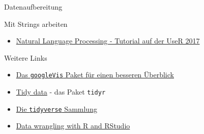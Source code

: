 \documentclass[ignorenonframetext,]{beamer}
\providecommand{\tightlist}{%
\setlength{\itemsep}{0pt}\setlength{\parskip}{0pt}}
\begin{document}
\begin{frame}[fragile]{Datenaufbereitung}
\begin{block}{Mit Strings arbeiten}
\begin{itemize}
\tightlist
\item
  \href{https://github.com/statsmaths/useR2017_nlp}{Natural Language
  Processing - Tutorial auf der UseR 2017}
\end{itemize}

\end{block}

\begin{block}{Weitere Links}

\begin{itemize}
\item
  \href{https://cran.r-project.org/web/packages/googleVis/vignettes/googleVis_examples.html}{Das
  \texttt{googleVis} Paket für einen besseren Überblick}
\item
  \href{https://cran.r-project.org/web/packages/tidyr/vignettes/tidy-data.html}{Tidy
  data} - das Paket \texttt{tidyr}
\item
  \href{http://tidyverse.org/}{Die \texttt{tidyverse} Sammlung}
\item
  \href{https://www.rstudio.com/resources/webinars/data-wrangling-with-r-and-rstudio/}{Data
  wrangling with R and RStudio}
\end{itemize}

\end{block}

\end{frame}
\end{document}
